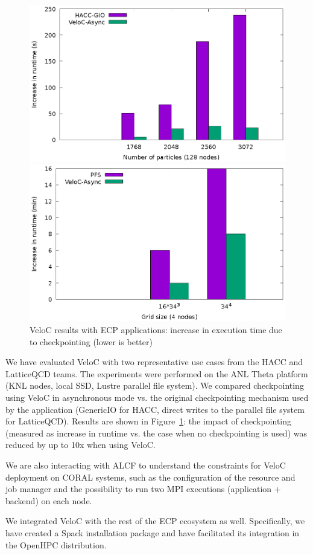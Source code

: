 \begin{figure}[t]
  \begin{subfloat}
  \centering
  \includegraphics[width=.47\textwidth]{projects/2.3.4-DataViz/2.3.4.05-VeloC/veloc-hacc}
  \end{subfloat}
  \hfill
  \begin{subfloat}
  \centering
  \includegraphics[width=.47\textwidth]{projects/2.3.4-DataViz/2.3.4.05-VeloC/veloc-lqcd}
  \end{subfloat}
  \caption{VeloC results with ECP applications: increase in execution time due to checkpointing (lower is better)}
  \label{fig:veloc:results}%
\end{figure}

We have evaluated VeloC with two representative use cases from the
HACC and LatticeQCD teams. The experiments were performed on the
ANL Theta platform (KNL nodes, local SSD, Lustre parallel file system).
We compared checkpointing using VeloC in asynchronous mode vs. the
original checkpointing mechanism used by the application (GenericIO
for HACC, direct writes to the parallel file system for LatticeQCD).
Results are shown in Figure~\ref{fig:veloc:results}: the impact
of checkpointing (measured as increase in runtime vs. the case
when no checkpointing is used) was reduced by up to 10x when using
VeloC.

We are also interacting with ALCF to understand the constraints for
VeloC deployment on CORAL systems, such as the configuration of the
resource and job manager and the possibility to run two MPI executions
(application + backend) on each node.

We integrated VeloC with the rest of the ECP ecosystem as well. Specifically,
we have created a Spack installation package and have facilitated its
integration in the OpenHPC distribution.

